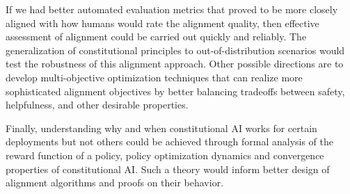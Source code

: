 \documentclass[conference]{IEEEtran}
\begin{document}
If we had better automated evaluation metrics that proved to be more closely aligned with how humans would rate the alignment quality, then effective assessment of alignment could be carried out quickly and reliably. The generalization of constitutional principles to out-of-distribution scenarios would test the robustness of this alignment approach. Other possible directions are to develop multi-objective optimization techniques that can realize more sophisticated alignment objectives by better balancing tradeoffs between safety, helpfulness, and other desirable properties.

Finally, understanding why and when constitutional AI works for certain deployments but not others could be achieved through formal analysis of the reward function of a policy, policy optimization dynamics and convergence properties of constitutional AI. Such a theory would inform better design of alignment algorithms and proofs on their behavior.
\end{document}
